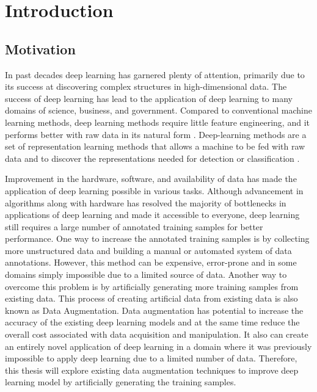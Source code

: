 
\chapter{Introduction}

\section{Motivation}

\label{chapter:intro}
In past decades deep learning has garnered plenty of attention, primarily due to its success at discovering complex structures in high-dimensional data. The success of deep learning has lead to the application of deep learning to many domains of science, business, and government. Compared to conventional machine learning methods, deep learning methods require little feature engineering, and it performs better with raw data in its natural form \citep{lecun2015deep}. Deep-learning methods are a set of representation learning methods that allows a machine to be fed with raw data and to discover the representations needed for detection or classification \citep{lecun2015deep}.

Improvement in the hardware, software, and availability of data has made the application of deep learning possible in various tasks. Although advancement in algorithms along with hardware has resolved the majority of bottlenecks in applications of deep learning and made it accessible to everyone, deep learning still requires a large number of annotated training samples for better performance. One way to increase the annotated training samples is by collecting more unstructured data and building a manual or automated system of data annotations. However, this method can be expensive, error-prone and in some domains simply impossible due to a limited source of data. Another way to overcome this problem is by artificially generating more training samples from existing data. This process of creating artificial data from existing data is also known as Data Augmentation. Data augmentation has potential to increase the accuracy of the existing deep learning models and at the same time reduce the overall cost associated with data acquisition and manipulation. It also can create an entirely novel application of deep learning in a domain where it was previously impossible to apply deep learning due to a limited number of data. Therefore, this thesis will explore existing data augmentation techniques to improve deep learning model by artificially generating the training samples.

